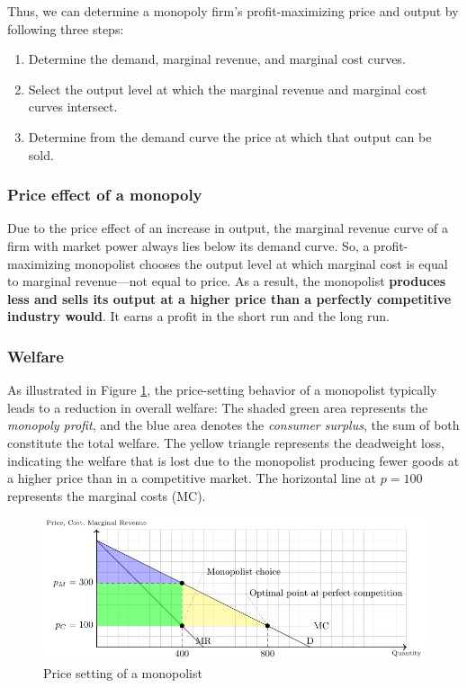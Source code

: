 \documentclass[
  12pt,
  oneside]{book}
\providecommand{\tightlist}{%
  \setlength{\itemsep}{0pt}\setlength{\parskip}{0pt}}
\theoremstyle{definition}
\theoremstyle{definition}
\theoremstyle{definition}
\theoremstyle{definition}
\theoremstyle{remark}
\begin{document}
Thus, we can determine a monopoly firm's profit-maximizing price and output by following three steps:

\begin{enumerate}
\def\labelenumi{\arabic{enumi}.}
\tightlist
\item
  Determine the demand, marginal revenue, and marginal cost curves.
\item
  Select the output level at which the marginal revenue and marginal cost curves intersect.
\item
  Determine from the demand curve the price at which that output can be sold.
\end{enumerate}

\hypertarget{price-effect-of-a-monopoly}{%
\subsubsection*{Price effect of a monopoly}\label{price-effect-of-a-monopoly}}

Due to the price effect of an increase in output, the marginal revenue curve of a firm with market power always lies below its demand curve. So, a profit-maximizing monopolist chooses the output level at which marginal cost is equal to marginal revenue---not equal to price. As a result, the monopolist \textbf{produces less and sells its output at a higher price than a perfectly competitive industry would}. It earns a profit in the short run and the long run.

\hypertarget{welfare}{%
\subsubsection*{Welfare}\label{welfare}}

As illustrated in Figure \ref{fig:mono2}, the price-setting behavior of a monopolist typically leads to a reduction in overall welfare: The shaded green area represents the \emph{monopoly profit}, and the blue area denotes the \emph{consumer surplus}, the sum of both constitute the total welfare. The yellow triangle represents the deadweight loss, indicating the welfare that is lost due to the monopolist producing fewer goods at a higher price than in a competitive market. The horizontal line at \(p=100\) represents the marginal costs (MC).

\begin{figure}
\centering
\includegraphics[width=1\textwidth,height=\textheight]{fig/monopoly.png}
\caption{\label{fig:mono2} Price setting of a monopolist}
\end{figure}
\end{document}
